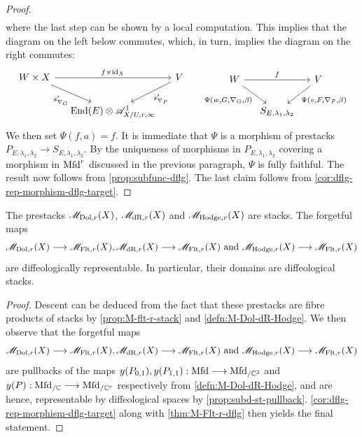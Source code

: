 \documentclass[11pt]{amsart}
\begin{document}
\begin{proof}
\begin{align*}
\end{align*}
where the last step can be shown by a local computation. This implies that the diagram on the
left below commutes, which, in turn, implies the diagram on the right commutes:
\[\begin{tikzcd}[column sep=small]
W \times X \ar[rr, "f \times \id_X"] \ar[rd, "s'_{\nabla_G}" below left] & &
V \ar[ld, "s'_{\nabla_F}" below right] \\
& \End(E) \otimes \sA_{X/U, r, \infty}^1 &
\end{tikzcd}
\hspace{1.5em}
\begin{tikzcd}[column sep=small]
W \ar[rr, "f"] \ar[rd, "{\Psi(w, G, \nabla_G, \beta)}" below left] & &
V \ar[ld, "{\Psi(v, F, \nabla_F, \beta)}" below right] \\
& S_{E, \lambda_1, \lambda_2} &
\end{tikzcd}\]
We then set $\Psi(f, a) = f$. It is immediate that $\Psi$ is a morphism of prestacks
$P_{E, \lambda_1, \lambda_2} \to S_{E, \lambda_1, \lambda_2}$. By the uniqueness of morphisms
in $P_{E, \lambda_1, \lambda_2}$ covering a morphism in $\mathrm{Mfd}^r$ discussed in the previous
paragraph, $\Psi$ is fully faithful.
The result now follows from \cref{prop:subfunc-dflg}.
The last claim follows from \cref{cor:dflg-rep-morphism-dflg-target}.
\end{proof}

\begin{thm}\label{thm:M-Dol-dR-Hodge-dflg}
The prestacks $\mathscr{M}_{\mathrm{Dol}, r}(X)$, $\mathscr{M}_{\mathrm{dR}, r}(X)$ and $\mathscr{M}_{\mathrm{Hodge}, r}(X)$ are stacks.
The forgetful maps
\[
\sM_{\Dol, r}(X) \to \sM_{\Flt, r}(X),
\sM_{\dR, r}(X) \to \sM_{\Flt, r}(X)
\text{ and } \sM_{\Hodge, r}(X) \to \sM_{\Flt, r}(X)
\]
are diffeologically representable.
In particular, their domains are diffeological stacks.
\end{thm}
\begin{proof}
Descent can be deduced from the fact that these prestacks are fibre products of stacks by
\cref{prop:M-flt-r-stack} and \cref{defn:M-Dol-dR-Hodge}.
We then observe that the forgetful maps
\[
\sM_{\Dol, r}(X) \to \sM_{\Flt, r}(X),
\sM_{\dR, r}(X) \to \sM_{\Flt, r}(X)
\text{ and } \sM_{\Hodge, r}(X) \to \sM_{\Flt, r}(X)
\]
are pullbacks of the maps $y(P_{0, 1}), y(P_{1, 1}) : \Mfd \to \Mfd_{/\bC^2}$ and
$y(P) : \Mfd_{/\bC} \to \Mfd_{/\bC^r}$ respectively
from \cref{defn:M-Dol-dR-Hodge}, and are hence, representable by diffeological spaces by
\cref{prop:subd-st-pullback}. \cref{cor:dflg-rep-morphism-dflg-target} along with
\cref{thm:M-Flt-r-dflg} then yields the final statement.
\end{proof}
\end{document}
